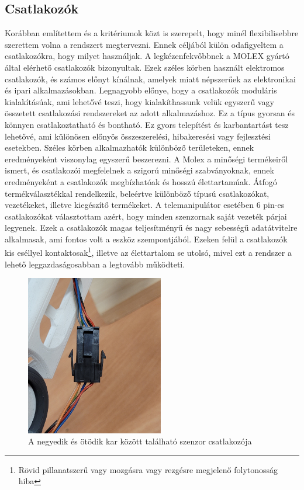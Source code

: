 \subsection{Csatlakozók}

Korábban említettem és a kritériumok közt is szerepelt, hogy minél flexibilisebbre szerettem volna a rendszert megtervezni. Ennek céljából külön odafigyeltem a csatlakozókra, hogy milyet használjak. A legkézenfekvőbbnek a MOLEX gyártó által elérhető csatlakozók bizonyultak. Ezek széles körben használt elektromos csatlakozók, és számos előnyt kínálnak, amelyek miatt népszerűek az elektronikai és ipari alkalmazásokban. Legnagyobb előnye, hogy a csatlakozók moduláris kialakításúak, ami lehetővé teszi, hogy kialakíthassunk velük egyszerű vagy összetett csatlakozási rendszereket az adott alkalmazáshoz. Ez a típus gyorsan és könnyen csatlakoztatható és bontható. Ez gyors telepítést és karbantartást tesz lehetővé, ami különösen előnyös összeszerelési, hibakeresési vagy fejlesztési esetekben. Széles körben alkalmazhatók különböző területeken, ennek eredményeként viszonylag egyszerű beszerezni. A Molex a minőségi termékeiről ismert, és csatlakozói megfelelnek a szigorú minőségi szabványoknak, ennek eredményeként a csatlakozók megbízhatóak és hosszú élettartamúak. Átfogó termékválasztékkal rendelkezik, beleértve különböző típusú csatlakozókat, vezetékeket, illetve kiegészítő termékeket. A telemanipulátor esetében 6 pin-es csatlakozókat választottam azért, hogy minden szenzornak saját vezeték párjai legyenek. Ezek a csatlakozók magas teljesítményű és nagy sebességű adatátvitelre alkalmasak, ami fontos volt a eszköz szempontjából. Ezeken felül a csatlakozók kis eséllyel kontaktosak\footnote{Rövid pillanatszerű vagy mozgásra vagy rezgésre megjelenő folytonosság hiba}, illetve az élettartalom se utolsó, mivel ezt a rendszer a lehető leggazdaságosabban a legtovább működteti.

\begin{figure}[!ht]
\centering
\includegraphics[width=60mm, keepaspectratio]{figures/Csuklo_szog_teszt/molex_valos}
\caption{A negyedik és ötödik kar között található szenzor csatlakozója}
\label{fig:csuklo_csatlakozo}
\end{figure}

